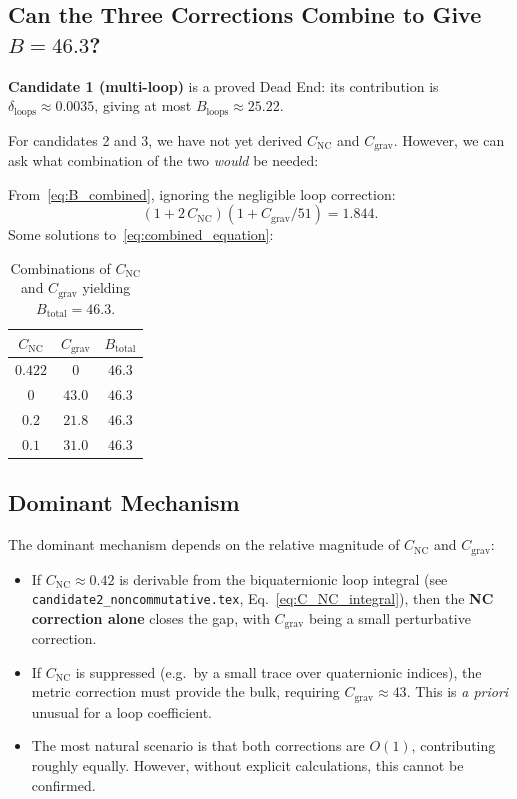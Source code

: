\documentclass[11pt,a4paper]{article}
\theoremstyle{remark}
\begin{document}
\subsection{Can the Three Corrections Combine to Give \texorpdfstring{$B = 46.3$}{B = 46.3}?}

\textbf{Candidate 1 (multi-loop)} is a proved Dead End: its contribution is $\delta_{\mathrm{loops}} \approx 0.0035$, giving at most $B_{\mathrm{loops}} \approx 25.22$.

For candidates 2 and 3, we have not yet derived $C_{\mathrm{NC}}$ and $C_{\mathrm{grav}}$. However, we can ask what combination of the two \emph{would} be needed:

From~\eqref{eq:B_combined}, ignoring the negligible loop correction:
\begin{equation}
  (1 + 2\,C_{\mathrm{NC}})(1 + C_{\mathrm{grav}}/51) = 1.844.
  \label{eq:combined_equation}
\end{equation}
Some solutions to~\eqref{eq:combined_equation}:

\begin{table}[h]
  \centering
  \caption{Combinations of $C_{\mathrm{NC}}$ and $C_{\mathrm{grav}}$ yielding
    $B_{\mathrm{total}} = 46.3$.}
  \label{tab:C_combinations}
  \begin{tabular}{ccc}
    \toprule
    $C_{\mathrm{NC}}$ & $C_{\mathrm{grav}}$ & $B_{\mathrm{total}}$ \\
    \midrule
    $0.422$ & $0$    & $46.3$ \\
    $0$     & $43.0$ & $46.3$ \\
    $0.2$   & $21.8$ & $46.3$ \\
    $0.1$   & $31.0$ & $46.3$ \\
    \bottomrule
  \end{tabular}
\end{table}

\subsection{Dominant Mechanism}

The dominant mechanism depends on the relative magnitude of $C_{\mathrm{NC}}$ and $C_{\mathrm{grav}}$:

\begin{itemize}
  \item If $C_{\mathrm{NC}} \approx 0.42$ is derivable from the biquaternionic loop
    integral (see \texttt{candidate2\_noncommutative.tex}, Eq.~\eqref{eq:C_NC_integral}), then
    the \textbf{NC correction alone} closes the gap, with $C_{\mathrm{grav}}$ being a
    small perturbative correction.
  \item If $C_{\mathrm{NC}}$ is suppressed (e.g.\ by a small trace over quaternionic indices),
    the metric correction must provide the bulk, requiring $C_{\mathrm{grav}} \approx 43$.
    This is \emph{a priori} unusual for a loop coefficient.
  \item The most natural scenario is that both corrections are $O(1)$, contributing roughly
    equally. However, without explicit calculations, this cannot be confirmed.
\end{itemize}
\end{document}
